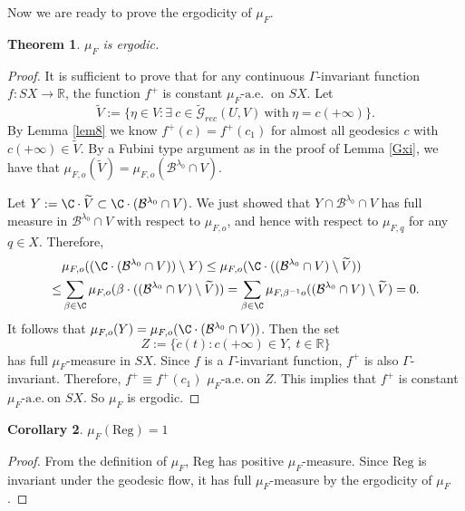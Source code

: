 \documentclass[11pt]{amsart}
\newtheorem{theorem}{Theorem}[section]
\newtheorem{corollary}[theorem]{Corollary}
\theoremstyle{definition}
\newtheorem{remark}[theorem]{Remark}
\newcommand{\BBB}{\mathcal{B}}
\newcommand{\F}{\mathcal{F}}
\newcommand{\UR}{\mathcal{UR}}
\def\pX{{\partial X}}
\def\b{\beta}
\def\l{\lambda}   \def\L{\Lambda}
\def\ae{\text{-a.e.}\ }
\begin{document}
Now we are ready to prove the ergodicity of $\mu_F$.
\begin{theorem}\label{ergodic}
$\mu_F$ is ergodic.
\end{theorem}
\begin{proof}
It is sufficient to prove that for any continuous $\Gamma$-invariant function $f:SX \to \mathbb{R}$, the function $f^+$ is constant $\mu_F \ae$ on $SX$. Let 
$$\widetilde{V}:=\{\eta \in V : \exists~c \in \widetilde {\mathcal{G}}_{rec}(U,V)~\mbox{with}~\eta=c(+\infty)\}.$$
By Lemma \ref{lem8} we know $f^{+}(c)=f^+(c_1)$ for almost all geodesics $c$ with $c(+\infty)\in \widetilde{V}$. By a Fubini type argument as in the proof of Lemma \ref{Gxi}, we have that $\mu_{F,o}(\widetilde{V})=\mu_{F,o}(\BBB^{\l_0}\cap V)$.

Let $Y:=\C\cdot \widetilde{V}\subset \C\cdot (\BBB^{\l_0}\cap V)$. We just showed that $Y\cap \BBB^{\l_0}\cap V$ has full measure in $\BBB^{\l_0}\cap V$ with respect to $\mu_{F,o}$, and hence with respect to $\mu_{F,q}$ for any $q\in X$. Therefore, 
\begin{equation*}
\begin{aligned}
&\mu_{F,o}((\C\cdot (\BBB^{\l_0} \cap V))\setminus Y)\le \mu_{F,o}(\C\cdot ((\BBB^{\l_0}\cap V)\setminus \widetilde{V}))\\
\le &\sum_{\b\in \C}\mu_{F,o}(\b\cdot ((\BBB^{\l_0}\cap V)\setminus \widetilde{V}))=\sum_{\b\in \C}\mu_{F,\b^{-1} o}((\BBB^{\l_0}\cap V)\setminus \widetilde{V})=0.
\end{aligned}
\end{equation*}
It follows that $\mu_{F,o}(Y)=\mu_{F,o}(\C\cdot (\BBB^{\l_0} \cap V))$.
Then the set
$$Z := \{\dot c(t) : c(+\infty)\in Y, ~t\in\mathbb{R}\}$$
has full $\mu_{F}$-measure in $SX$. Since $f$ is a $\Gamma$-invariant function,
$f^{+}$ is also $\Gamma$-invariant. Therefore,
 $f^{+}\equiv f^+(c_1)$ $\mu_F \ae$on $Z$. This implies that $f^+$ is constant $\mu_F \ae$on $SX$.
 So $\mu_F$ is ergodic.
\end{proof}

\begin{corollary}\label{regularfull}
  $\mu_F(\text{Reg})=1$  
\end{corollary}
\begin{proof}
From the definition of $\mu_F$, $\text{Reg}$ has positive $\mu_F$-measure. Since $\text{Reg}$ is invariant under the geodesic flow, it has full $\mu_F$-measure by the ergodicity of $\mu_F$.
\end{proof}

\end{document}

